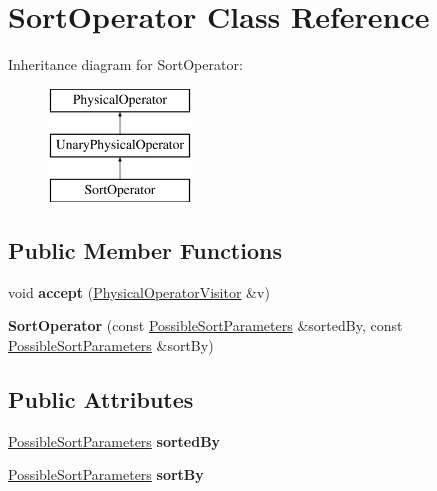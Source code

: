 \hypertarget{class_sort_operator}{\section{Sort\+Operator Class Reference}
\label{class_sort_operator}
}
Inheritance diagram for Sort\+Operator\+:\begin{figure}[H]
\begin{center}
\leavevmode
\includegraphics[height=3.000000cm]{class_sort_operator}
\end{center}
\end{figure}
\subsection*{Public Member Functions}
\begin{DoxyCompactItemize}
\item 
\hypertarget{class_sort_operator_aff5d834234616ce2d36efda9639b734b}{void {\bfseries accept} (\hyperlink{class_physical_operator_visitor}{Physical\+Operator\+Visitor} \&v)}\label{class_sort_operator_aff5d834234616ce2d36efda9639b734b}

\item 
\hypertarget{class_sort_operator_aae40824efc238dfbf2bbde0badb66138}{{\bfseries Sort\+Operator} (const \hyperlink{class_possible_sort_parameters}{Possible\+Sort\+Parameters} \&sorted\+By, const \hyperlink{class_possible_sort_parameters}{Possible\+Sort\+Parameters} \&sort\+By)}\label{class_sort_operator_aae40824efc238dfbf2bbde0badb66138}

\end{DoxyCompactItemize}
\subsection*{Public Attributes}
\begin{DoxyCompactItemize}
\item 
\hypertarget{class_sort_operator_a7e3eb99b6ce1ed9d927a5e3975269be5}{\hyperlink{class_possible_sort_parameters}{Possible\+Sort\+Parameters} {\bfseries sorted\+By}}\label{class_sort_operator_a7e3eb99b6ce1ed9d927a5e3975269be5}

\item 
\hypertarget{class_sort_operator_a36cfb27acb196ceb5d801b62dc2494cc}{\hyperlink{class_possible_sort_parameters}{Possible\+Sort\+Parameters} {\bfseries sort\+By}}\label{class_sort_operator_a36cfb27acb196ceb5d801b62dc2494cc}

\end{DoxyCompactItemize}


